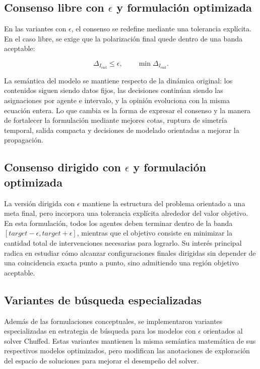 \documentclass[10pt,letterpaper]{article}
\begin{document}
\subsection{Consenso libre con \(\epsilon\) y formulaci\'on optimizada}

En las variantes con \(\epsilon\), el consenso se redefine mediante una tolerancia expl\'icita. En el caso libre, se exige que la polarizaci\'on final quede dentro de una banda aceptable:

\[
\Delta_{I_{\text{end}}}\leq \epsilon,
\qquad
\min \Delta_{I_{\text{end}}}.
\]

La sem\'antica del modelo se mantiene respecto de la din\'amica original: los contenidos siguen siendo datos fijos, las decisiones contin\'uan siendo las asignaciones por agente e intervalo, y la opini\'on evoluciona con la misma ecuaci\'on entera. Lo que cambia es la forma de expresar el consenso y la manera de fortalecer la formulaci\'on mediante mejores cotas, ruptura de simetr\'ia temporal, salida compacta y decisiones de modelado orientadas a mejorar la propagaci\'on.

\subsection{Consenso dirigido con \(\epsilon\) y formulaci\'on optimizada}

La versi\'on dirigida con \(\epsilon\) mantiene la estructura del problema orientado a una meta final, pero incorpora una tolerancia expl\'icita alrededor del valor objetivo. En esta formulaci\'on, todos los agentes deben terminar dentro de la banda \([target-\epsilon,target+\epsilon]\), mientras que el objetivo consiste en minimizar la cantidad total de intervenciones necesarias para lograrlo. Su inter\'es principal radica en estudiar c\'omo alcanzar configuraciones finales dirigidas sin depender de una coincidencia exacta punto a punto, sino admitiendo una regi\'on objetivo aceptable.

\subsection{Variantes de b\'usqueda especializadas}

Adem\'as de las formulaciones conceptuales, se implementaron variantes especializadas en estrategia de b\'usqueda para los modelos con \(\epsilon\) orientados al solver Chuffed. Estas variantes mantienen la misma sem\'antica matem\'atica de sus respectivos modelos optimizados, pero modifican las anotaciones de exploraci\'on del espacio de soluciones para mejorar el desempe\~no del solver.
\end{document}
